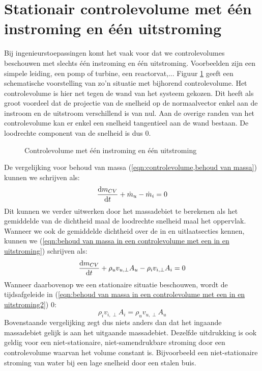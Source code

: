 	\section{Stationair controlevolume met één instroming en één uitstroming}	
Bij ingenieurstoepassingen komt het vaak voor dat we controlevolumes beschouwen met slechts één instroming en één uitstroming. Voorbeelden zijn een simpele leiding, een pomp of turbine, een reactorvat,... 
Figuur \ref{fig:controlevolume een in en uitstroming} geeft een schematische voorstelling van zo'n situatie met bijhorend controlevolume. Het controlevolume is hier net tegen de wand van het systeem gekozen. Dit heeft als groot voordeel dat de projectie van de snelheid op de normaalvector enkel aan de instroom en de uitstroom verschillend is van nul. Aan de overige randen van het controlevolume kan er enkel een snelheid tangentieel aan de wand bestaan. De loodrechte component van de snelheid is dus $0$.
\begin{figure}[htb]
	\centering
	
	\caption{Controlevolume met één instroming en één uitstroming}
	\label{fig:controlevolume een in en uitstroming}
\end{figure}
De vergelijking voor behoud van massa (\ref{eqn:controlevolume,behoud van massa}) kunnen we schrijven als:
\begin{equation}
	\dfrac{\mathrm{d} m_{CV}}{\mathrm{d} t} + \dot{m}_{u} - \dot{m}_{i} = 0
	\label{eqn:behoud van massa in een controlevolume met een in en uitstroming}
\end{equation}
Dit kunnen we verder uitwerken door het massadebiet te berekenen als  het gemiddelde van de dichtheid maal de loodrechte snelheid maal het oppervlak. Wanneer we ook de gemiddelde dichtheid over de in en uitlaatsecties kennen, kunnen we (\ref{eqn:behoud van massa in een controlevolume met een in en uitstroming}) schrijven als:
\begin{equation}
	\dfrac{\mathrm{d} m_{CV}}{\mathrm{d} t} + \rho_{u} v_{u,\perp} A_{u} - \rho_{i} v_{i,\perp} A_{i} = 0
	\label{eqn:behoud van massa in een controlevolume met een in en uitstroming2}
\end{equation}
Wanneer daarbovenop we een stationaire situatie beschouwen, wordt de tijdsafgeleide in (\ref{eqn:behoud van massa in een controlevolume met een in en uitstroming2}) $0$:
\begin{equation}
	\rho_i v_{i,\perp} A_i = \rho_u v_{u,\perp} A_u
	\label{eqn:behoud van massa in een stationair controlevolume met een in en uitstroming}
\end{equation}
Bovenstaande vergelijking zegt dus niets anders dan dat het ingaande massadebiet gelijk is aan het uitgaande massadebiet. Dezelfde uitdrukking is ook geldig voor een niet-stationaire, niet-samendrukbare stroming door een controlevolume waarvan het volume constant is. Bijvoorbeeld een niet-stationaire stroming van water bij een lage snelheid door een stalen buis.

